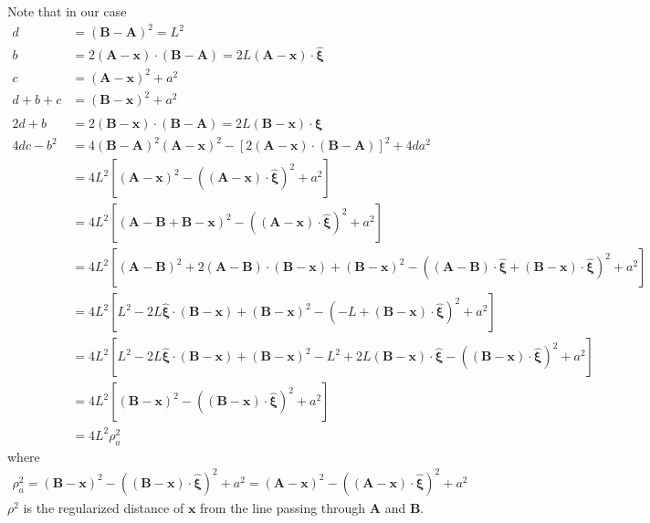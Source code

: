 Note that in our case
\begin{align}
d&=(\bm B-\bm A)^2=L^2\\
b&=2(\bm A-\bm x)\cdot(\bm B-\bm A)=2L(\bm A-\bm x)\cdot\hat{\bm\xi}\\
c&=(\bm A-\bm x)^2+a^2\\
d+b+c&=(\bm B-\bm x)^2+a^2\\
2d+b&=2(\bm B-\bm x)\cdot(\bm B-\bm A)=2L(\bm B-\bm x)\cdot{\hat{\bm \xi}}\\
4dc-b^2&=4(\bm B-\bm A)^2(\bm A-\bm x)^2-[2(\bm A-\bm x)\cdot(\bm B-\bm A)]^2+4da^2\nonumber\\
&=4L^2[(\bm A-\bm x)^2-((\bm A-\bm x)\cdot\hat{\bm\xi})^2+a^2]\nonumber\\
&=4L^2[(\bm A-\bm B+\bm B-\bm x)^2-((\bm A-\bm x)\cdot\hat{\bm\xi})^2+a^2]\nonumber\\
&=4L^2[(\bm A-\bm B)^2+2(\bm A-\bm B)\cdot(\bm B-\bm x)+(\bm B-\bm x)^2-((\bm A-\bm B)\cdot\hat{\bm\xi}+(\bm B-\bm x)\cdot\hat{\bm\xi})^2+a^2]\nonumber\\
&=4L^2[L^2-2L\hat{\bm\xi}\cdot(\bm B-\bm x)+(\bm B-\bm x)^2-(-L+(\bm B-\bm x)\cdot\hat{\bm\xi})^2+a^2]\nonumber\\
&=4L^2[L^2-2L\hat{\bm\xi}\cdot(\bm B-\bm x)+(\bm B-\bm x)^2-L^2+2L(\bm B-\bm x)\cdot\hat{\bm\xi}-((\bm B-\bm x)\cdot\hat{\bm\xi})^2+a^2]\nonumber\\
&=4L^2[(\bm B-\bm x)^2-((\bm B-\bm x)\cdot\hat{\bm\xi})^2+a^2]\nonumber\\
&=4L^2\rho^2_a
\end{align}
where 
\begin{align}
\rho^2_a=(\bm B-\bm x)^2-((\bm B-\bm x)\cdot\hat{\bm\xi})^2+a^2=(\bm A-\bm x)^2-((\bm A-\bm x)\cdot\hat{\bm\xi})^2+a^2
\end{align}
$\rho^2$ is the regularized distance of $\bm x$ from the line passing through $\bm A$ and $\bm B$.




